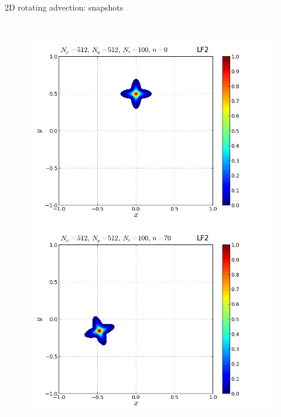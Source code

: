 \documentclass{beamer}
\begin{document}
\begin{frame}{2D rotating advection: snapshots}

\vspace*{-5.5mm}
\begin{columns}
\begin{figure}
\centering
 \includegraphics[width=\textwidth]{graphics/plot_-_flower_F12_LF2_Nx512Nt100_it00000}\\ \vspace*{-4mm}
 \includegraphics[width=\textwidth]{graphics/plot_-_flower_F12_LF2_Nx512Nt100_it00070}

\end{figure}
\end{columns}
\end{frame}
\end{document}
